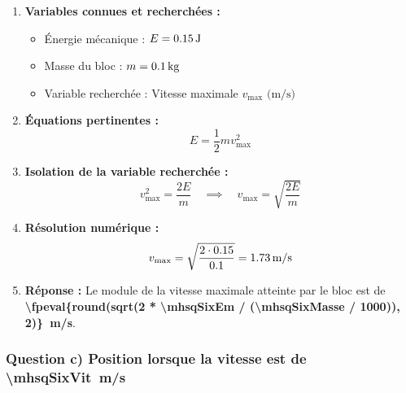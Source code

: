 \begin{enumerate}[label=\arabic*)]
    \item \textbf{Variables connues et recherchées :}
    \begin{itemize}[label= -]
        \item Énergie mécanique : $E = \qty{0.15}{J}$
        \item Masse du bloc : $m = \qty{\fpeval{\mhsqSixMasse / 1000}}{kg}$
        \item Variable recherchée : Vitesse maximale $v_{\max} \text{ (m/s)}$
    \end{itemize}

    \item \textbf{Équations pertinentes :}
    \[
    E = \frac{1}{2} m v_{\max}^2
    \]

    \item \textbf{Isolation de la variable recherchée :}
    \[
    v_{\max}^2 = \frac{2E}{m} \quad \implies \quad v_{\max} = \sqrt{\frac{2E}{m}}
    \]

    \item \textbf{Résolution numérique :}
    \[
    v_{\max} = \sqrt{\frac{2 \cdot \mhsqSixEm}{\fpeval{\mhsqSixMasse / 1000}}} = \qty{\fpeval{round(sqrt(2 * \mhsqSixEm / (\mhsqSixMasse / 1000)), 2)}}{m/s}
    \]

    \item \textbf{Réponse :}
    Le module de la vitesse maximale atteinte par le bloc est de \textbf{\qty{\fpeval{round(sqrt(2 * \mhsqSixEm / (\mhsqSixMasse / 1000)), 2)}}{m/s}}.
\end{enumerate}


\subsubsection*{Question c) Position lorsque la vitesse est de \qty{\mhsqSixVit}{m/s}}

